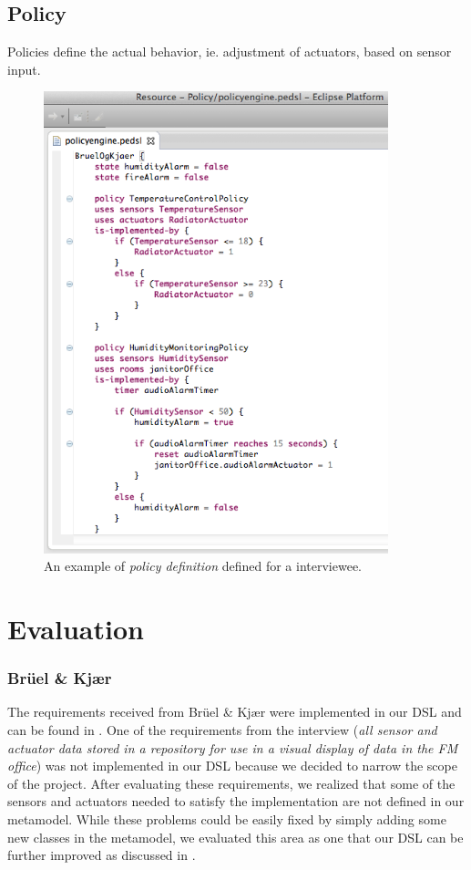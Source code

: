 \documentclass{llncs}
\begin{document}
\newpage
\subsection{Policy}\label{subsec:policies}
Policies define the actual behavior, ie. adjustment of actuators, based on sensor input. 

\begin{figure}
  \centering
    \includegraphics[width=10cm]{dsl-policy-definition.png} 
	\caption{An example of \textit{policy definition} defined for a interviewee.}
	\label{fig:dsl-policy-definition}
\end{figure}

\newpage
\section{Evaluation}\label{sec:evaluation}

\subsubsection{Br\"{u}el \& Kj\ae r}\label{subsec:bruel}
The requirements received from Br\"{u}el \& Kj\ae r were implemented in our DSL and can be found in . One of the requirements from the interview (\textit{all sensor and actuator data stored in a repository for use in a visual display of data in the FM office}) was not implemented in our DSL because we decided to narrow the scope of the project. After evaluating these requirements, we realized that some of the sensors and actuators needed to satisfy the implementation are not defined in our metamodel. While these problems could be easily fixed by simply adding some new classes in the metamodel, we evaluated this area as one that our DSL can be further improved as discussed in .
\end{document}
